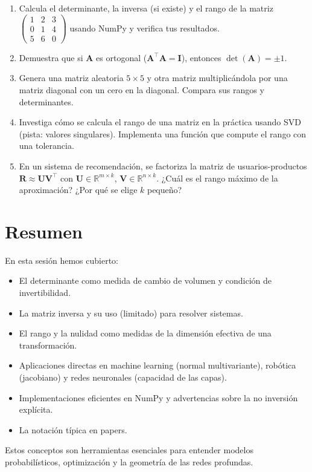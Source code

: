 \documentclass[12pt,a4paper,openany,oneside]{book}
\begin{document}
\begin{enumerate}
    \item Calcula el determinante, la inversa (si existe) y el rango de la matriz $\begin{pmatrix} 1 & 2 & 3 \\ 0 & 1 & 4 \\ 5 & 6 & 0 \end{pmatrix}$ usando NumPy y verifica tus resultados.
    \item Demuestra que si $\mathbf{A}$ es ortogonal ($\mathbf{A}^\top \mathbf{A} = \mathbf{I}$), entonces $\det(\mathbf{A}) = \pm 1$.
    \item Genera una matriz aleatoria $5\times 5$ y otra matriz multiplicándola por una matriz diagonal con un cero en la diagonal. Compara sus rangos y determinantes.
    \item Investiga cómo se calcula el rango de una matriz en la práctica usando SVD (pista: valores singulares). Implementa una función que compute el rango con una tolerancia.
    \item En un sistema de recomendación, se factoriza la matriz de usuarios-productos $\mathbf{R} \approx \mathbf{U}\mathbf{V}^\top$ con $\mathbf{U} \in \mathbb{R}^{m\times k}$, $\mathbf{V} \in \mathbb{R}^{n\times k}$. ¿Cuál es el rango máximo de la aproximación? ¿Por qué se elige $k$ pequeño?
\end{enumerate}

\section{Resumen}

En esta sesión hemos cubierto:
\begin{itemize}
    \item El determinante como medida de cambio de volumen y condición de invertibilidad.
    \item La matriz inversa y su uso (limitado) para resolver sistemas.
    \item El rango y la nulidad como medidas de la dimensión efectiva de una transformación.
    \item Aplicaciones directas en machine learning (normal multivariante), robótica (jacobiano) y redes neuronales (capacidad de las capas).
    \item Implementaciones eficientes en NumPy y advertencias sobre la no inversión explícita.
    \item La notación típica en papers.
\end{itemize}
Estos conceptos son herramientas esenciales para entender modelos probabilísticos, optimización y la geometría de las redes profundas.
\end{document}

